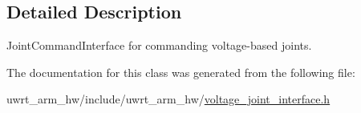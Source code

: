 \subsection{Detailed Description}
Joint\+Command\+Interface for commanding voltage-\/based joints. 

The documentation for this class was generated from the following file\+:\begin{DoxyCompactItemize}
\item 
uwrt\+\_\+arm\+\_\+hw/include/uwrt\+\_\+arm\+\_\+hw/\hyperlink{voltage__joint__interface_8h}{voltage\+\_\+joint\+\_\+interface.\+h}\end{DoxyCompactItemize}
